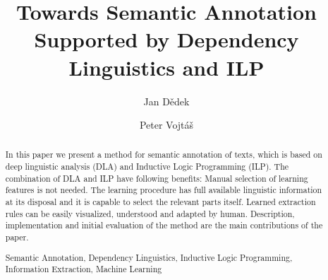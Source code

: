 \documentclass[runningheads,a4paper]{llncs}
\newcommand{\keywords}[1]{\par\addvspace\baselineskip
\noindent\keywordname\enspace\ignorespaces#1}
\begin{document}
\mainmatter  %

\title{Towards Semantic Annotation Supported by Dependency Linguistics and ILP}


%
%
\author{Jan D\v{e}dek
\and Peter Vojt\'{a}\v{s}}
%


%
%

\maketitle


\begin{abstract}
In this paper we present a method for semantic annotation of texts, which is based on deep linguistic analysis (DLA) and Inductive Logic Programming (ILP). The combination of DLA and ILP have following benefits: Manual selection of learning features is not needed. The learning procedure has full available linguistic information at its disposal and it is capable to select the relevant parts itself. Learned extraction rules can be easily visualized, understood and adapted by human.
Description, implementation and initial evaluation of the method are the main contributions of the paper.
\keywords{Semantic Annotation, Dependency Linguistics, Inductive Logic Programming, Information Extraction, Machine Learning}
\end{abstract}
\end{document}
